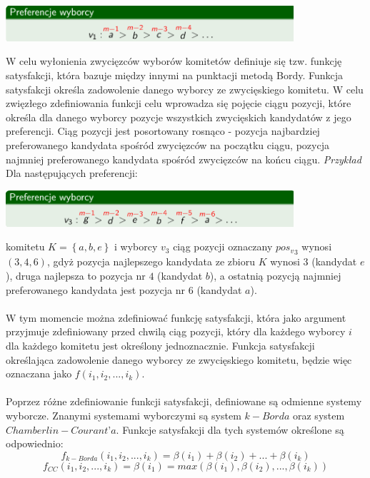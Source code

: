\documentclass[polish,11pt]{aghthesis}
\begin{document}
\begin{center}
\includegraphics[width=0.8\textwidth]{pics/Borda_points.png}
\end{center}
W celu wyłonienia zwycięzców wyborów komitetów definiuje się tzw. funkcję satysfakcji,
która bazuje między innymi na punktacji metodą Bordy. Funkcja satysfakcji określa
zadowolenie danego wyborcy ze zwycięskiego komitetu. W celu zwięzłego zdefiniowania
funkcji celu wprowadza się pojęcie ciągu pozycji, które określa dla danego wyborcy pozycje
wszystkich zwycięskich kandydatów z jego preferencji. Ciąg pozycji jest posortowany
rosnąco - pozycja najbardziej preferowanego kandydata spośród zwycięzców na początku
ciągu, pozycja najmniej preferowanego kandydata spośród zwycięzców na końcu ciągu.
\clearpage
\noindent
\emph{Przykład} \\ 
Dla następujących preferencji:
\begin{center}
\includegraphics[width=0.8\textwidth]{pics/positions.png}
\end{center}
komitetu $K = \left\{a, b, e\right\}$ i wyborcy $v_3$ ciąg pozycji oznaczany ${pos_v}_3$ wynosi $(3,4,6)$, gdyż pozycja najlepszego kandydata ze zbioru $K$ wynosi $3$ (kandydat $e$), druga najlepsza to pozycja nr $4$ (kandydat $b$), a ostatnią pozycją najmniej preferowanego kandydata jest pozycja nr $6$ (kandydat $a$). \\ \\
W tym momencie można zdefiniować funkcję satysfakcji, która jako argument przyjmuje
zdefiniowany przed chwilą ciąg pozycji, który dla każdego wyborcy $i$ dla każdego komitetu
jest określony jednoznacznie. Funkcja satysfakcji określająca zadowolenie danego wyborcy
ze zwycięskiego komitetu, będzie więc oznaczana jako $f(i_1, i_2, ... , i_k)$. \\ \\
Poprzez różne zdefiniowanie funkcji satysfakcji, definiowane są odmienne systemy
wyborcze. Znanymi systemami wyborczymi są system $k-Borda$ oraz system
$Chamberlin-Courant’a$. Funkcje satysfakcji dla tych systemów określone są odpowiednio:
$$f_{k-Borda}(i_1, i_2, ..., i_k) = \beta(i_1) + \beta(i_2) + ... + \beta(i_k) 
$$ $$f_{CC}(i_1, i_2, ..., i_k) = \beta(i_1) = max(\beta(i_1), \beta(i_2), ..., \beta(i_k))$$
\end{document}

